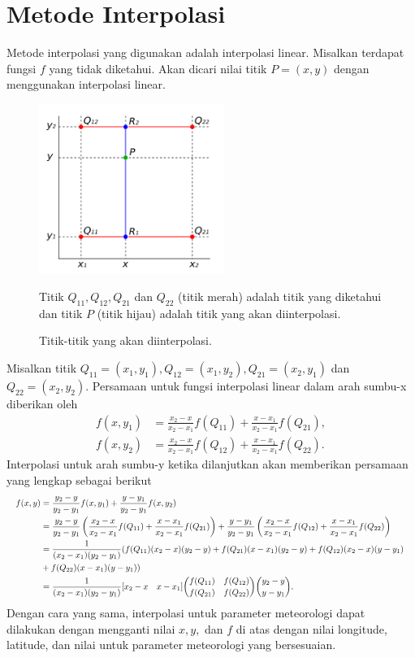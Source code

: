 \section[Metode Interpolasi]{Metode Interpolasi}
\begin{spacing}{1.5}
	Metode interpolasi yang digunakan adalah interpolasi linear. Misalkan terdapat fungsi $f$ yang tidak diketahui. Akan dicari nilai titik $P=(x,y)$ dengan menggunakan interpolasi linear. 
	\begin{figure}[H]
		\centering
		\includegraphics[width=6cm]{contents/BilinearInterpolationV2}
		\caption{Titik-titik yang akan diinterpolasi.} 
		\label{fig:interp}
		\medspace
		\small
		Titik $Q_{11},Q_{12},Q_{21}$ dan $Q_{22}$ (titik merah) adalah titik yang diketahui dan titik $P$ (titik hijau) adalah titik yang akan diinterpolasi.
	\end{figure}
	Misalkan titik $Q_{11}=(x_1,y_1),Q_{12}=(x_1,y_2),Q_{21}=(x_2,y_1)$ dan $Q_{22}=(x_2,y_2)$. Persamaan untuk fungsi interpolasi linear dalam arah sumbu-x diberikan oleh
	\begin{equation*}
		\begin{aligned}
			f(x,y_1)&=\frac{x_2-x}{x_2-x_1}f(Q_{11})+\frac{x-x_1}{x_2-x_1}f(Q_{21}),\\
			f(x,y_2)&=\frac{x_2-x}{x_2-x_1}f(Q_{12})+\frac{x-x_1}{x_2-x_1}f(Q_{22}).
		\end{aligned}
	\end{equation*}
	Interpolasi untuk arah sumbu-y ketika dilanjutkan akan memberikan persamaan yang lengkap sebagai berikut
	\begin{equation*}
		 \resizebox{\textwidth}{!}{%
			$
		\begin{aligned}
			f(x,y)&=\frac{y_2-y}{y_2-y_1}f(x,y_1)+\frac{y-y_1}{y_2-y_1}f(x,y_2)\\
			&=\frac{y_2-y}{y_2-y_1}\left(\frac{x_2-x}{x_2-x_1}f(Q_{11})+\frac{x-x_1}{x_2-x_1}f(Q_{21})\right)+\frac{y-y_1}{y_2-y_1}\left(\frac{x_2-x}{x_2-x_1}f(Q_{12})+\frac{x-x_1}{x_2-x_1}f(Q_{22})\right)\\
			&=\frac{1}{(x_2-x_1)(y_2-y_1)}(f(Q_{11})(x_2-x)(y_2-y)+f(Q_{21})(x-x_1)(y_2-y)+f(Q_{12})(x_2-x)(y-y_1)\\
			&+f(Q_{22})(x-x_1)(y-y_1))\\
			&=\frac{1}{(x_2-x_1)(y_2-y_1)}[x_2-x \quad x-x_1]\binom{f(Q_{11})\quad f(Q_{12})}{f(Q_{21})\quad f(Q_{22})}\binom{y_2-y}{y-y_1}.%
		\end{aligned}
		$
	}
	\end{equation*}
		Dengan cara yang sama, interpolasi untuk parameter meteorologi dapat dilakukan dengan mengganti nilai $x,y,$ dan $f$ di atas dengan nilai longitude, latitude, dan nilai untuk parameter meteorologi yang bersesuaian.
\end{spacing}	
